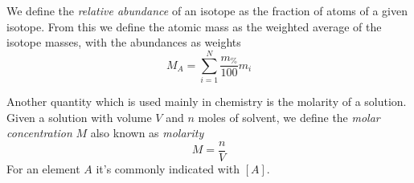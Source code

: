 \documentclass[../qm.tex]{subfiles}
\begin{document}
\begin{dfn}
	We define the \emph{relative abundance} of an isotope as the fraction of atoms of a given isotope. From this we define the atomic mass as the weighted average of the isotope masses, with the abundances as weights 
	\begin{equation}
		M_A=\sum_{i=1}^N\frac{m_{\%}}{100}m_i
		\label{eq:atomicmass.chem}
	\end{equation}
\end{dfn}
Another quantity which is used mainly in chemistry is the molarity of a solution. Given a solution with volume $V$ and $n$ moles of solvent, we define the \emph{molar concentration} $M$ also known as \emph{molarity}
\begin{equation}
	M=\frac{n}{V}
	\label{eq:molarity.chem}
\end{equation}
For an element $A$ it's commonly indicated with $[A]$.
\end{document}
